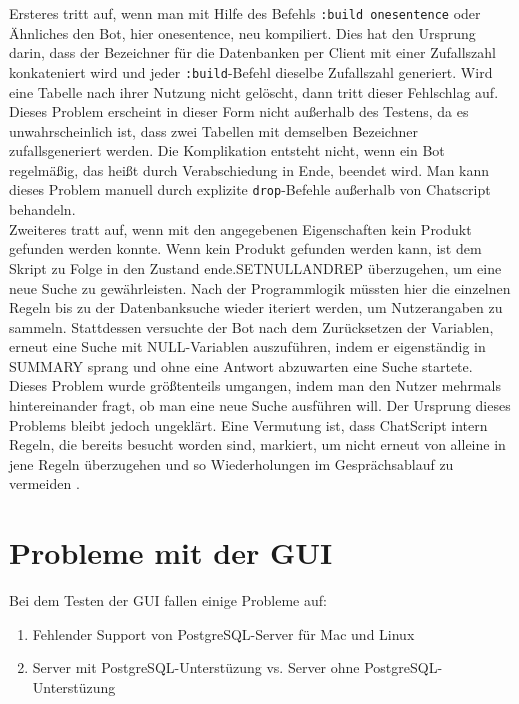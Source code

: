 Ersteres tritt auf, wenn man mit Hilfe des Befehls \lstinline|:build onesentence| oder Ähnliches den Bot, hier onesentence, neu kompiliert. Dies hat den Ursprung darin, dass der Bezeichner für die Datenbanken per Client mit einer Zufallszahl konkateniert wird und jeder \lstinline|:build|-Befehl dieselbe Zufallszahl generiert. Wird eine Tabelle nach ihrer Nutzung nicht gelöscht, dann tritt dieser Fehlschlag auf.\\
Dieses Problem erscheint in dieser Form nicht außerhalb des Testens, da es unwahrscheinlich ist, dass zwei Tabellen mit demselben Bezeichner zufallsgeneriert werden. Die Komplikation entsteht nicht, wenn ein Bot regelmäßig, das heißt durch Verabschiedung in Ende, beendet wird. Man kann dieses Problem manuell durch explizite \lstinline|drop|-Befehle außerhalb von Chatscript behandeln.\\
Zweiteres tratt auf, wenn mit den angegebenen Eigenschaften kein Produkt gefunden werden konnte. Wenn kein Produkt gefunden werden kann, ist dem Skript zu Folge in den Zustand \texttildelow ende.SETNULLANDREP überzugehen, um eine neue Suche zu gewährleisten. Nach der Programmlogik müssten hier die einzelnen Regeln bis zu der Datenbanksuche wieder iteriert werden, um Nutzerangaben zu sammeln. Stattdessen versuchte der Bot nach dem Zurücksetzen der Variablen, erneut eine Suche mit NULL-Variablen auszuführen, indem er eigenständig in SUMMARY sprang und ohne eine Antwort abzuwarten eine Suche startete.\\
Dieses Problem wurde größtenteils umgangen, indem man den Nutzer mehrmals hintereinander fragt, ob man eine neue Suche ausführen will. Der Ursprung dieses Problems bleibt jedoch ungeklärt. Eine Vermutung ist, dass ChatScript intern Regeln, die bereits besucht worden sind, markiert, um nicht erneut von alleine in jene Regeln überzugehen und so Wiederholungen im Gesprächsablauf zu vermeiden \citep{chatscript2019}.\\


\section{Probleme mit der GUI}
\label{sec: Probleme mit der GUI}

Bei dem Testen der GUI fallen einige Probleme auf: 

\begin{enumerate}
\item{Fehlender Support von PostgreSQL-Server für Mac und Linux}
\item{Server mit PostgreSQL-Unterstüzung vs. Server ohne PostgreSQL-Unterstüzung}
\end{enumerate}


